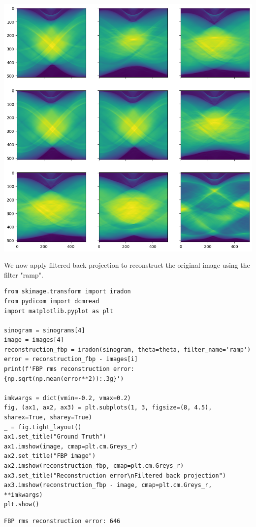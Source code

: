 \documentclass[a4paper, 11pt]{article}
\begin{document}
\begin{center}
\includegraphics[width=.9\linewidth]{./.ob-jupyter/ca23fbc2abe1e301745f7fca7b78276cebdc3789.png}
\end{center}

We now apply filtered back projection to reconstruct the original image using the filter "ramp".
\begin{verbatim}
from skimage.transform import iradon
from pydicom import dcmread
import matplotlib.pyplot as plt

sinogram = sinograms[4]
image = images[4]
reconstruction_fbp = iradon(sinogram, theta=theta, filter_name='ramp')
error = reconstruction_fbp - images[i]
print(f'FBP rms reconstruction error: {np.sqrt(np.mean(error**2)):.3g}')

imkwargs = dict(vmin=-0.2, vmax=0.2)
fig, (ax1, ax2, ax3) = plt.subplots(1, 3, figsize=(8, 4.5), sharex=True, sharey=True)
_ = fig.tight_layout()
ax1.set_title("Ground Truth")
ax1.imshow(image, cmap=plt.cm.Greys_r)
ax2.set_title("FBP image")
ax2.imshow(reconstruction_fbp, cmap=plt.cm.Greys_r)
ax3.set_title("Reconstruction error\nFiltered back projection")
ax3.imshow(reconstruction_fbp - image, cmap=plt.cm.Greys_r, **imkwargs)
plt.show()
\end{verbatim}

\begin{verbatim}
FBP rms reconstruction error: 646
\end{verbatim}
\end{document}

